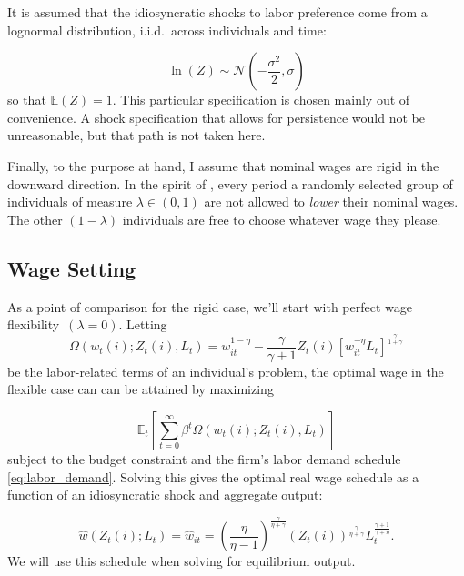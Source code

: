 \documentclass[12pt,a4paper]{scrartcl}            %
\begin{document}
It is assumed that the idiosyncratic shocks to labor preference come from a lognormal distribution, i.i.d.\ across individuals and time:

\begin{equation}
    \label{eq:shock_dist}
    \ln(Z) \sim \mathcal{N}\left(-\frac{\sigma^2}{2}, \sigma\right)
\end{equation}
%
so that $\mathbb{E}(Z) = 1$.
This particular specification is chosen mainly out of convenience.
A shock specification that allows for persistence would not be unreasonable, but that path is not taken here.


Finally, to the purpose at hand, I assume that nominal wages are rigid in the downward direction.
In the spirit of \cite{calvo_1983}, every period a randomly selected group of individuals of measure $\lambda \in \left(0, 1\right)$ are not allowed to \emph{lower} their nominal wages.
The other $\left(1 - \lambda \right)$ individuals are free to choose whatever wage they please.
\subsection{Wage Setting}
\label{sub:wage_setting}

As a point of comparison for the rigid case, we'll start with perfect wage flexibility~$(\lambda = 0)$.
Letting
\begin{equation}
    \label{eq:labor_part}
    \Omega( w_t(i); Z_t(i), L_t ) = w_{it}^{1 - \eta} - \frac{\gamma}{\gamma + 1}Z_t(i)\left[ w_{it}^{-\eta}L_t \right]^{\frac{\gamma}{1 + \gamma}}
\end{equation}
%
be the labor-related terms of an individual's problem, the optimal wage in the flexible case can can be attained by maximizing

\begin{equation}
    \label{eq:labor_opt}
    \mathbb{E}_t\left[\sum_{t=0}^{\infty}\beta^t \Omega( w_t(i); Z_t(i), L_t ) \right]
\end{equation}
%
subject to the budget constraint and the firm's labor demand schedule \eqref{eq:labor_demand}.
Solving this gives the optimal real wage schedule as a function of an idiosyncratic shock and aggregate output:

\begin{equation}
    \label{eq:flex}
    \hat{w}(Z_t(i); L_t) = \hat{w}_{it} = \left( \frac{\eta}{\eta - 1} \right)^{\frac{\gamma}{\eta + \gamma}}\left( Z_t(i) \right)^{\frac{\gamma}{\eta + \gamma}} L_t^{\frac{\gamma + 1}{\gamma + \eta}}.
\end{equation}
%
We will use this schedule when solving for equilibrium output.
\end{document}
